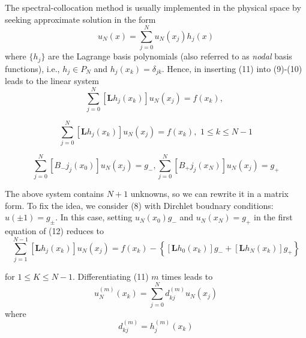 The spectral-collocation method is usually implemented in the physical space by seeking approximate solution in the form
\begin{equation}
	u_{ N }(x) = \sum_{ j=0 }^{ N } u_{ N }(x_{ j }) h_{ j }(x)	
\end{equation}
where $ \{ h_{ j } \} $ are the Lagrange basis polynomials (also referred to as \textit{nodal} basis functions), i.e., $ h_{ j } \in P_{ N } $ and $ h_{ j } (x_{ k }) = \delta_{ jk } $. Hence, in inserting (11) into (9)-(10) leads to the linear system
\begin{equation}
	\sum_{ j=0 }^{ N } \left[ \mathbf{ L }h_{ j }(x_{ k }) \right] u_{ N }(x_{ j }) = f(x_{ k }), \hspace{4pt}
\end{equation}

\begin{equation}
	\sum_{ j=0 }^{ N } \left[ \mathbf{ L } h_{ j }(x_{ k }) \right] u_{ N }\left( x_{ j } \right) = f\left( x_{ k } \right), \hspace{4pt} 1 \leq k \leq N-1
\end{equation}

\begin{equation}
	\sum_{ j=0 }^{ N } \left[ B_{ - }j_{ j }\left( x_{ 0 } \right) \right] u_{ N } \left( x_{ j } \right) = g_{ - }, \sum_{ j=0 }^{ N } \left[ B_{ + } j_{ j } \left( x_{ N } \right) \right] u_{ N } (x_{ j }) = g_{ + }
\end{equation}

The above system contains $ N+1 $ unknowns, so we can rewrite it in a matrix form. To fix the idea, we consider (8) with Dirchlet boudnary conditions: $ u( \pm 1) = g_{ \pm } $. In this case, setting $ u_{ N }\left( x_{ 0 } \right) g_{ - } $ and $ u_{ N } \left( x_{ N } \right) = g_{ + } $  in the first equation of (12) reduces to 
\begin{equation}
	\sum_{ j=1 }^{ N-1 } \left[ \mathbf{ L } h_{ j } (x_{ k }) \right] u_{ N } \left( x_{ j } \right) = f(x_{ k }) - \left\{ \left[ \mathbf{ L }h_{ 0 }\left( x_{ k } \right) \right]g_{ - } + \left[ \mathbf{ L } h_{ N } (x_{ k }) \right] g_{ + } \right\}
\end{equation}

for $ 1 \leq K \leq N-1 $. Differentiating (11) $ m $ times leads to 
\begin{equation}
	u_{ N }^{ \left( m \right) } \left( x_{ k } \right) = \sum_{ j=0 }^{ N } d_{ kj }^{ \left( m \right) } u_{ N } \left( x_{ j } \right)
\end{equation}
where
\begin{equation}
	d_{ kj }^{ \left( m \right) } = h_{ j }^{ \left( m \right) } \left( x_{ k } \right)
\end{equation}



